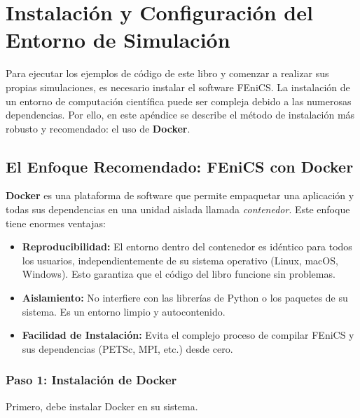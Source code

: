 \chapter{Instalación y Configuración del Entorno de Simulación}
\label{app:install}

Para ejecutar los ejemplos de código de este libro y comenzar a realizar sus propias simulaciones, es necesario instalar el software FEniCS. La instalación de un entorno de computación científica puede ser compleja debido a las numerosas dependencias. Por ello, en este apéndice se describe el método de instalación más robusto y recomendado: el uso de \textbf{Docker}.

\section{El Enfoque Recomendado: FEniCS con Docker}
\textbf{Docker} es una plataforma de software que permite empaquetar una aplicación y todas sus dependencias en una unidad aislada llamada \textit{contenedor}. Este enfoque tiene enormes ventajas:
\begin{itemize}
    \item \textbf{Reproducibilidad:} El entorno dentro del contenedor es idéntico para todos los usuarios, independientemente de su sistema operativo (Linux, macOS, Windows). Esto garantiza que el código del libro funcione sin problemas.
    \item \textbf{Aislamiento:} No interfiere con las librerías de Python o los paquetes de su sistema. Es un entorno limpio y autocontenido.
    \item \textbf{Facilidad de Instalación:} Evita el complejo proceso de compilar FEniCS y sus dependencias (PETSc, MPI, etc.) desde cero.
\end{itemize}

\subsection{Paso 1: Instalación de Docker}
Primero, debe instalar Docker en su sistema.
